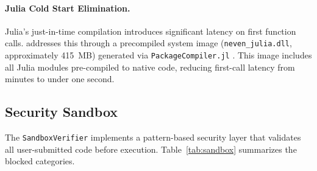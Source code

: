 \paragraph{Julia Cold Start Elimination.}
Julia's just-in-time compilation introduces significant latency on first function calls. \neven{} addresses this through a precompiled system image (\texttt{neven\_julia.dll}, approximately 415~MB) generated via \texttt{PackageCompiler.jl} \citep{PackageCompiler2023}. This image includes all \neven{} Julia modules pre-compiled to native code, reducing first-call latency from minutes to under one second.

\subsection{Security Sandbox}
\label{subsec:sandbox}

The \texttt{SandboxVerifier} implements a pattern-based security layer that validates all user-submitted code before execution. Table~\ref{tab:sandbox} summarizes the blocked categories.

\begin{table}[htbp]
\centering
\small
\caption{Security sandbox: blocked operation categories per language. Each category includes multiple specific patterns (30+ total per language).}
\label{tab:sandbox}
\end{table}

